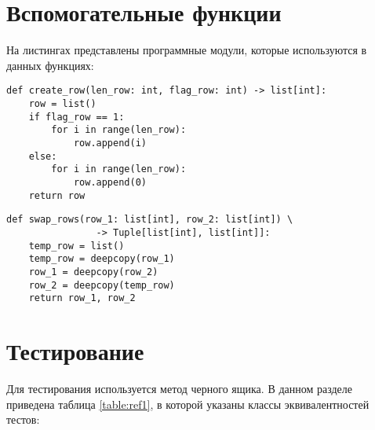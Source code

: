 \section{Вспомогательные функции}
На листингах представлены программные модули, которые используются в данных функциях:
\begin{lstlisting}[label=some-code,caption=Программный код создания для кэша в виде строки]
def create_row(len_row: int, flag_row: int) -> list[int]:
	row = list()
	if flag_row == 1:
		for i in range(len_row):
			row.append(i)
	else:
		for i in range(len_row):
			row.append(0)
	return row
\end{lstlisting}

\begin{lstlisting}[label=some-code,caption=Программный код обмена двух строк]
def swap_rows(row_1: list[int], row_2: list[int]) \
				-> Tuple[list[int], list[int]]:
	temp_row = list()
	temp_row = deepcopy(row_1)
	row_1 = deepcopy(row_2)
	row_2 = deepcopy(temp_row)
	return row_1, row_2
\end{lstlisting}

\section{Тестирование}
Для тестирования используется метод черного ящика. В данном разделе приведена таблица \ref{table:ref1}, в которой указаны классы эквивалентностей тестов: \\

